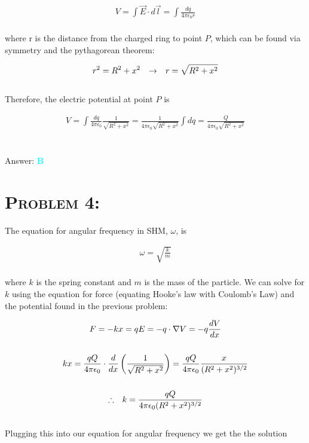 \documentclass{article}
\begin{document}
\begin{gather}
V = \int{\vec{E} \cdot d\vec{l}} = \int{\frac{dq}{4 \pi \epsilon_{0} r}}
\end{gather}
\\
where r is the distance from the charged ring to point $P$, which can be found via symmetry and the pythagorean theorem:

\begin{gather}
r^{2} = R^{2} +x^{2} \hspace{.1in} \rightarrow \hspace{.1in} r = \sqrt{R^{2} +x^{2}}\nonumber
\end{gather}
\\
Therefore, the electric potential at point $P$ is 

\begin{gather}
V = \int{\frac{dq}{4 \pi \epsilon_{0}}\frac{1}{\sqrt{R^{2} +x^{2}}}} = \frac{1}{4 \pi \epsilon_{0} \sqrt{R^{2} +x^{2}}} \int{dq} = \frac{Q}{4 \pi \epsilon_{0} \sqrt{R^{2} +x^{2}}} \nonumber
\end{gather}
\\\\
Answer: \textbf{\textcolor{cyan}B}\\


\section{\textsc{Problem 4:}} The equation for angular frequency in SHM, $\omega$, is 

\begin{gather}
\omega = \sqrt{\frac{k}{m}}
\end{gather}
\\
where $k$ is the spring constant and $m$ is the mass of the particle. We can solve for $k$ using the equation for force (equating Hooke's law with Coulomb's Law) and the potential found in the previous problem:

\begin{gather}
F = -k x = qE = -q \cdot \nabla V = -q \frac{dV}{dx} \\
\nonumber\\
kx =\frac{qQ}{4 \pi \epsilon_{0}} \cdot \frac{d}{dx} \left(  \frac{1}{\sqrt{R^{2} + x^{2}}}   \right) = \frac{qQ}{4 \pi \epsilon_{0}} \frac{x}{(R^{2} + x^{2})^{3/2}}\nonumber\\
\nonumber\\
\therefore \hspace{.1in} k = \frac{qQ}{4 \pi \epsilon_{0} (R^{2} + x^{2})^{3/2}} \nonumber
\end{gather}
\\
Plugging this into our equation for angular frequency we get the the solution
\end{document}
